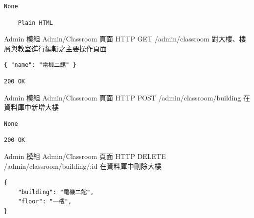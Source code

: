 \documentclass{article}
\begin{document}
\begin{lrbox}{\jsoninputbox}
	\begin{lstlisting}
None
\end{lstlisting}
\end{lrbox}

\begin{lrbox}{\jsonoutputbox}
	\begin{lstlisting}
	Plain HTML
\end{lstlisting}
\end{lrbox}

{Admin 模組}
{Admin/Classroom 頁面}
{HTTP GET}
{/admin/classroom}
{對大樓、樓層與教室進行編輯之主要操作頁面}

\bigskip

\begin{lrbox}{\jsoninputbox}
	\begin{lstlisting}[basicstyle=\footnotesize\ttfamily]
{ "name": "電機二館" }
\end{lstlisting}
\end{lrbox}

\begin{lrbox}{\jsonoutputbox}
	\begin{lstlisting}
200 OK
\end{lstlisting}
\end{lrbox}

{Admin 模組}
{Admin/Classroom 頁面}
{HTTP POST}
{/admin/classroom/building}
{在資料庫中新增大樓}

\bigskip

\begin{lrbox}{\jsoninputbox}
	\begin{lstlisting}
None
\end{lstlisting}
\end{lrbox}

\begin{lrbox}{\jsonoutputbox}
	\begin{lstlisting}
200 OK
\end{lstlisting}
\end{lrbox}

{Admin 模組}
{Admin/Classroom 頁面}
{HTTP DELETE}
{/admin/classroom/building/:id}
{在資料庫中刪除大樓}

\bigskip

\begin{lrbox}{\jsoninputbox}
	\begin{lstlisting}[basicstyle=\tiny\ttfamily]
{
	"building": "電機二館",
	"floor": "一樓",
}
\end{lstlisting}
\end{lrbox}
\end{document}
